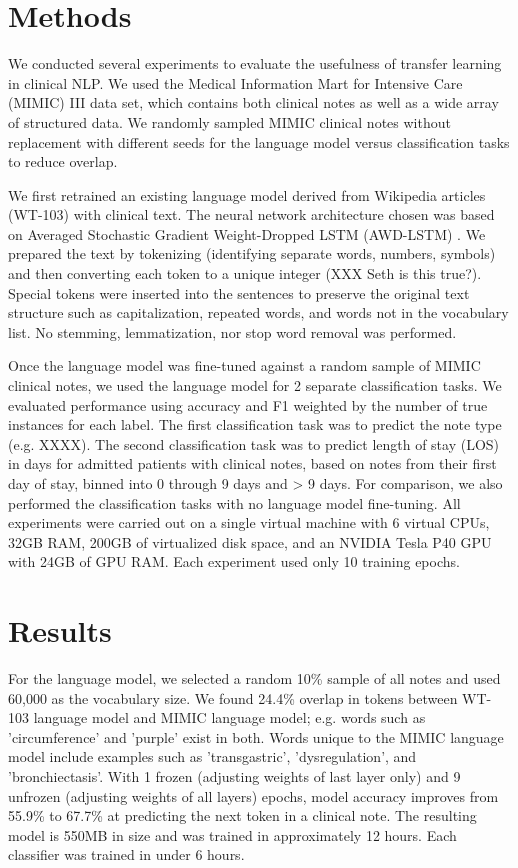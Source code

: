 \documentclass{amia}
\begin{document}
\section*{Methods}

We conducted several experiments to evaluate the usefulness of transfer learning in clinical NLP. We used the Medical Information Mart for Intensive Care (MIMIC) III \cite{johnson_mimic-iii_2016} data set, which contains both clinical notes as well as a wide array of structured data. We randomly sampled MIMIC clinical notes without replacement with different seeds for the language model versus classification tasks to reduce overlap.

We first retrained an existing language model derived from Wikipedia articles (WT-103) \cite{Merity2016Sep} with clinical text. The neural network architecture chosen was based on Averaged Stochastic Gradient Weight-Dropped LSTM (AWD-LSTM) \cite{Merity2017Aug}. We prepared the text by tokenizing (identifying separate words, numbers, symbols) and then converting each token to a unique integer (XXX Seth is this true?). Special tokens were inserted into the sentences to preserve the original text structure such as capitalization, repeated words, and words not in the vocabulary list. No stemming, lemmatization, nor stop word removal was performed.

Once the language model was fine-tuned against a random sample of MIMIC clinical notes, we used the language model for 2 separate classification tasks. We evaluated performance using accuracy and F1 weighted by the number of true instances for each label. The first classification task was to predict the note type (e.g. XXXX). The second classification task was to predict length of stay (LOS) in days for admitted patients with clinical notes, based on notes from their first day of stay, binned into 0 through 9 days and > 9 days. For comparison, we also performed the classification tasks with no language model fine-tuning. All experiments were carried out on a single virtual machine with 6 virtual CPUs, 32GB RAM, 200GB of virtualized disk space, and an NVIDIA Tesla P40 GPU with 24GB of GPU RAM. Each experiment used only 10 training epochs.

\section*{Results}

For the language model, we selected a random 10\% sample of all notes and used 60,000 as the vocabulary size. We found 24.4\% overlap in tokens between WT-103 language model and MIMIC language model; e.g. words such as 'circumference' and 'purple' exist in both. Words unique to the MIMIC language model include examples such as 'transgastric', 'dysregulation', and 'bronchiectasis'. With 1 frozen (adjusting weights of last layer only) and 9 unfrozen (adjusting weights of all layers) epochs, model accuracy improves from 55.9\% to 67.7\%  at predicting the next token in a clinical note. The resulting model is 550MB in size and was trained in approximately 12 hours. Each classifier was trained in under 6 hours.
\end{document}
